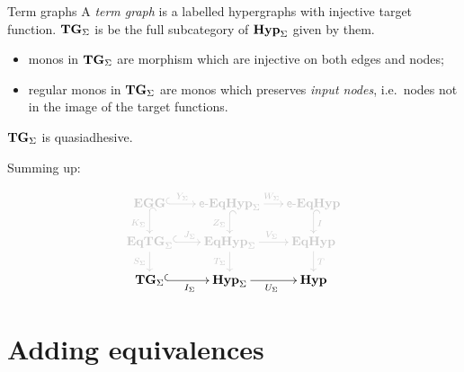 \documentclass{beamer}
\newcommand{\catname}[1]{\textbf{\textup{#1}}}
\newcommand{\tg}[0]{\catname{TG}_{\Sigma}}
\newcommand{\eg}{\catname{EGG}}
\newcommand{\egg}{\mathsf{e}\text{-}\catname{EqHyp}}
\newcommand{\hyp}{\catname{Hyp}}
\newcommand{\EqHyp}{\catname{EqHyp}} %
\newcommand{\EqTG}{\catname{EqTG}}
\begin{document}
\begin{frame}{Term graphs}
A \emph{term graph} \cite{corradini2005term,corradini1997algebraic, Plu:TGR-ENTCS} is a labelled hypergraphs with injective target function. $\tg$ is be the full subcategory of $\hyp_{\Sigma}$ given by them.

\pause 
\begin{itemize}
	\item monos in $\tg$ are morphism which are injective on both edges and nodes;\pause 
	\item regular monos in $\tg$ are monos which preserves \emph{input nodes}, i.e.~nodes not in the image of the target functions.
\end{itemize}
\pause 

\begin{theorem}
$\tg$ is quasiadhesive.
\end{theorem}

\end{frame}


\begin{frame}
	
	Summing up:
	
	
	\[\xymatrix@R=15pt@C=15pt{ \color{shaded}\eg \ar@{^{(}->}@[shaded][r]^-{\color{shaded}Y_\Sigma} \ar@{^{(}->}@[shaded][d]_{\color{shaded}K_\Sigma} & \color{shaded}\egg_\Sigma \ar@{^{(}->}@[shaded][d]_{\color{shaded} Z_\Sigma} \ar@[shaded][r]^{\color{shaded}W_\Sigma}&\color{shaded} \egg \ar@{^{(}->}@[shaded][d]^{\color{shaded}I}\\ \color{shaded}\EqTG_{\Sigma} \ar@{^{(}->}@[shaded][r]^{\color{shaded}J_\Sigma}\ar@[shaded][d]_{\color{shaded}S_\Sigma}&\color{shaded} \EqHyp_\Sigma \ar@[shaded][r]^{\color{shaded}V_\Sigma} \ar@[shaded][d]_{\color{shaded}T_\Sigma}&\color{shaded} \EqHyp \ar@[shaded][d]^{\color{shaded}T}\\ \tg \ar@{^{(}->}[r]_{I_\Sigma}& \hyp_{\Sigma} \ar[r]_{U_\Sigma}  &\hyp}\]
	
\end{frame}


\section{Adding equivalences}
\end{document}
